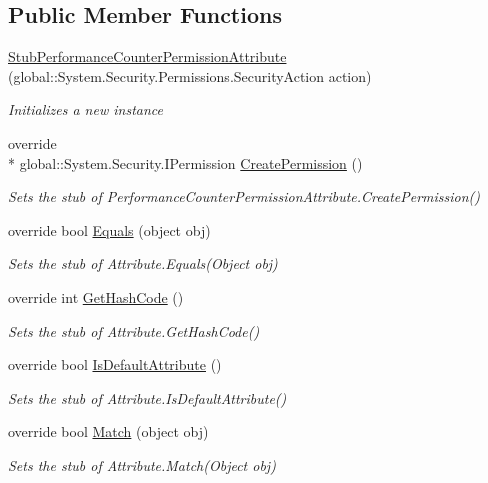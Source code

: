 \subsection*{Public Member Functions}
\begin{DoxyCompactItemize}
\item 
\hyperlink{class_system_1_1_diagnostics_1_1_fakes_1_1_stub_performance_counter_permission_attribute_a107fe19ac8fb7b1ef47ce24a69ab02a1}{Stub\-Performance\-Counter\-Permission\-Attribute} (global\-::\-System.\-Security.\-Permissions.\-Security\-Action action)
\begin{DoxyCompactList}\small\item\em Initializes a new instance\end{DoxyCompactList}\item 
override \\*
global\-::\-System.\-Security.\-I\-Permission \hyperlink{class_system_1_1_diagnostics_1_1_fakes_1_1_stub_performance_counter_permission_attribute_aaf48d9a2a475bf2d16d28bb3ddd15667}{Create\-Permission} ()
\begin{DoxyCompactList}\small\item\em Sets the stub of Performance\-Counter\-Permission\-Attribute.\-Create\-Permission()\end{DoxyCompactList}\item 
override bool \hyperlink{class_system_1_1_diagnostics_1_1_fakes_1_1_stub_performance_counter_permission_attribute_a48c299bfbe8bf94267b2d81beb730787}{Equals} (object obj)
\begin{DoxyCompactList}\small\item\em Sets the stub of Attribute.\-Equals(\-Object obj)\end{DoxyCompactList}\item 
override int \hyperlink{class_system_1_1_diagnostics_1_1_fakes_1_1_stub_performance_counter_permission_attribute_adbbc160f88311140d57de17eb577b93b}{Get\-Hash\-Code} ()
\begin{DoxyCompactList}\small\item\em Sets the stub of Attribute.\-Get\-Hash\-Code()\end{DoxyCompactList}\item 
override bool \hyperlink{class_system_1_1_diagnostics_1_1_fakes_1_1_stub_performance_counter_permission_attribute_a15790b1fb53bf46c63298ee98b1d649b}{Is\-Default\-Attribute} ()
\begin{DoxyCompactList}\small\item\em Sets the stub of Attribute.\-Is\-Default\-Attribute()\end{DoxyCompactList}\item 
override bool \hyperlink{class_system_1_1_diagnostics_1_1_fakes_1_1_stub_performance_counter_permission_attribute_adc493b209dd81fa32c410ca4059694c4}{Match} (object obj)
\begin{DoxyCompactList}\small\item\em Sets the stub of Attribute.\-Match(\-Object obj)\end{DoxyCompactList}\end{DoxyCompactItemize}
